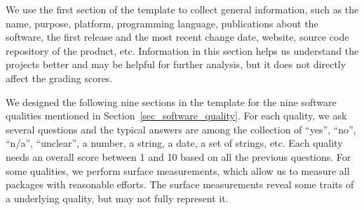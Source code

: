 \documentclass[3p, 12pt,authoryear]{elsarticle}
\begin{document}
We use the first section of the template to collect general information, such as
the name, purpose, platform, programming language, publications about the
software, the first release and the most recent change date, website, source
code repository of the product, etc. Information in this section helps us
understand the projects better and may be helpful for further analysis, but it
does not directly affect the grading scores.

We designed the following nine sections in the template for the nine software
qualities mentioned in Section~\ref{sec_software_quality}. For each quality, we
ask several questions and the typical answers are among the collection of
``yes'', ``no'', ``n/a'', ``unclear'', a number, a string, a date, a set of
strings, etc. Each quality needs an overall score between 1 and 10 based on all
the previous questions. For some qualities, we perform surface measurements,
which allow us to measure all packages with reasonable efforts. The surface
measurements reveal some traits of a underlying quality, but may not fully
represent it.
\end{document}
